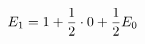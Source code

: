 \documentclass[preview]{standalone}
\begin{document}
\begin{align*}
\special{dvisvgm:raw <g id='unique000'>}E_1=1+\dfrac{1}{2}\cdot 0+\dfrac{1}{2}E_0\special{dvisvgm:raw </g>}
\end{align*}
\end{document}
